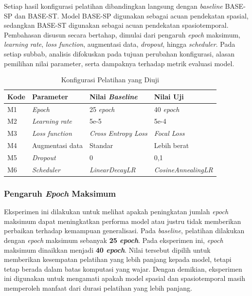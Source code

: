 Setiap hasil konfigurasi pelatihan dibandingkan langsung dengan \textit{baseline} BASE-SP dan BASE-ST. Model BASE-SP digunakan sebagai acuan pendekatan spasial, sedangkan BASE-ST digunakan sebagai acuan pendekatan spasiotemporal. Pembahasan disusun secara bertahap, dimulai dari pengaruh \textit{epoch} maksimum, \textit{learning rate}, \textit{loss function}, augmentasi data, \textit{dropout}, hingga \textit{scheduler}. Pada setiap subbab, analisis difokuskan pada tujuan perubahan konfigurasi, alasan pemilihan nilai parameter, serta dampaknya terhadap metrik evaluasi model.

\begin{table}[htbp]
\centering
\caption{Konfigurasi Pelatihan yang Diuji}
\label{table:4.ablation-config}
\begin{tabular}{llll}
\toprule
\textbf{Kode} &
\textbf{Parameter} &
\textbf{Nilai \textit{Baseline}} &
\textbf{Nilai Uji} \\
\midrule
M1 & \textit{Epoch} & 25 \textit{epoch} & 40 \textit{epoch} \\
M2 & \textit{Learning rate} & 5e-5 & 5e-4 \\
M3 & \textit{Loss function} & \textit{Cross Entropy Loss} & \textit{Focal Loss} \\
M4 & Augmentasi data & Standar & Lebih berat \\
M5 & \textit{Dropout} & 0 & 0,1 \\
M6 & \textit{Scheduler} & \textit{LinearDecayLR} & \textit{CosineAnnealingLR} \\
\bottomrule
\end{tabular}
\end{table}

\subsubsection{Pengaruh \textit{Epoch} Maksimum} \label{IV.Eksperimen_Ablation_Epoch}
Eksperimen ini dilakukan untuk melihat apakah peningkatan jumlah \textit{epoch} maksimum dapat meningkatkan performa model atau justru tidak memberikan perbaikan terhadap kemampuan generalisasi. Pada \textit{baseline}, pelatihan dilakukan dengan \textit{epoch} maksimum sebanyak \textbf{25 \textit{epoch}}. Pada eksperimen ini, \textit{epoch} maksimum dinaikkan menjadi \textbf{40 \textit{epoch}}. Nilai tersebut dipilih untuk memberikan kesempatan pelatihan yang lebih panjang kepada model, tetapi tetap berada dalam batas komputasi yang wajar. Dengan demikian, eksperimen ini digunakan untuk mengamati apakah model spasial dan spasiotemporal masih memperoleh manfaat dari durasi pelatihan yang lebih panjang.

